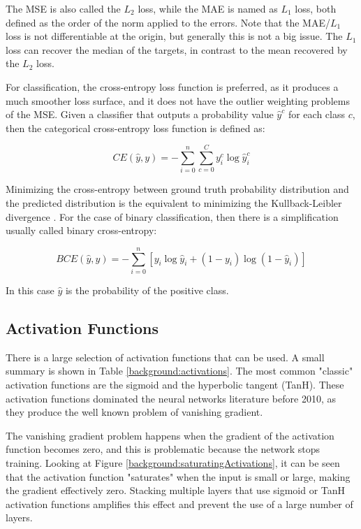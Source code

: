 The MSE is also called the $L_2$ loss, while the MAE is named as $L_1$ loss, both defined as the order of the norm applied to the errors. Note that the MAE/$L_1$ loss is not differentiable at the origin, but generally this is not a big issue. The $L_1$ loss can recover the median of the targets, in contrast to the mean recovered by the $L_2$ loss.

For classification, the cross-entropy loss function is preferred, as it produces a much smoother loss surface, and it does not have the outlier weighting problems of the MSE. Given a classifier that outputs a probability value $\hat{y}^c$ for each class $c$, then the categorical cross-entropy loss function is defined as:

\begin{equation}
	CE(\hat{y}, y) = -\sum_{i=0}^n \sum_{c=0}^C y_i^c \log \hat{y}_i^c
\end{equation}

Minimizing the cross-entropy between ground truth probability distribution and the predicted distribution is the equivalent to minimizing the Kullback-Leibler divergence \cite{mackay2003information}. For the case of binary classification, then there is a simplification usually called binary cross-entropy:

\begin{equation}
BCE(\hat{y}, y) = -\sum_{i=0}^n \left[ y_i  \log \hat{y}_i + (1 - y_i) \log (1 - \hat{y}_i) \right]
\end{equation}

In this case $\hat{y}$ is the probability of the positive class.

\subsection{Activation Functions}

There is a large selection of activation functions that can be used. A small summary is shown in Table \ref{background:activations}. The most common "classic" activation functions are the sigmoid and the hyperbolic tangent (TanH). These activation functions dominated the neural networks literature before 2010, as they produce the well known problem of vanishing gradient.

The vanishing gradient problem  happens when the gradient of the activation function becomes zero, and this is problematic because the network stops training. Looking at Figure \ref{background:saturatingActivations}, it can be seen that the activation function "saturates" when the input is small or large, making the gradient effectively zero. Stacking multiple layers that use sigmoid or TanH activation functions amplifies this effect and prevent the use of a large number of layers.

